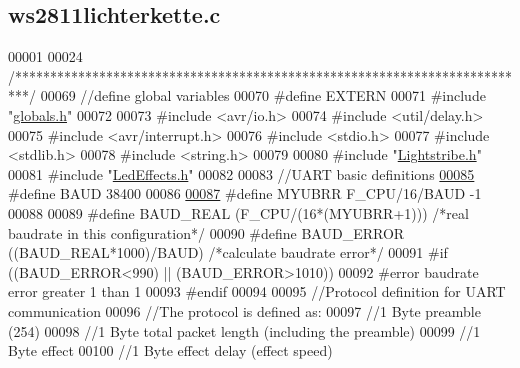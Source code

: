 \hypertarget{ws2811lichterkette_8c_source}{}\subsection{ws2811lichterkette.\+c}

\begin{DoxyCode}
00001 
00024 \textcolor{comment}{/**************************************************************************/}
00069 \textcolor{comment}{//define global variables}
00070 \textcolor{preprocessor}{#define EXTERN}
00071 \textcolor{preprocessor}{#include "\hyperlink{globals_8h}{globals.h}"}
00072 
00073 \textcolor{preprocessor}{#include <avr/io.h>}
00074 \textcolor{preprocessor}{#include <util/delay.h>}
00075 \textcolor{preprocessor}{#include <avr/interrupt.h>}
00076 \textcolor{preprocessor}{#include <stdio.h>}      
00077 \textcolor{preprocessor}{#include <stdlib.h>}    
00078 \textcolor{preprocessor}{#include <string.h>}
00079 
00080 \textcolor{preprocessor}{#include "\hyperlink{_lightstribe_8h}{Lightstribe.h}"}
00081 \textcolor{preprocessor}{#include "\hyperlink{_led_effects_8h}{LedEffects.h}"}
00082 
00083 \textcolor{comment}{//UART basic definitions}
\hypertarget{ws2811lichterkette_8c_source_l00085}{}\hyperlink{ws2811lichterkette_8c_a62634036639f88eece6fbf226b45f84b}{00085} \textcolor{comment}{}\textcolor{preprocessor}{#define BAUD 38400  }
00086 
\hypertarget{ws2811lichterkette_8c_source_l00087}{}\hyperlink{ws2811lichterkette_8c_a711e9130c825a7269c8c87dbb57a85e0}{00087} \textcolor{preprocessor}{#define MYUBRR F\_CPU/16/BAUD -1}
00088 
00089 \textcolor{preprocessor}{#define BAUD\_REAL (F\_CPU/(16*(MYUBRR+1)))       }\textcolor{comment}{/*real baudrate in this configuration*/}\textcolor{preprocessor}{}
00090 \textcolor{preprocessor}{#define BAUD\_ERROR ((BAUD\_REAL*1000)/BAUD)      }\textcolor{comment}{/*calculate baudrate error*/}\textcolor{preprocessor}{    }
00091 \textcolor{preprocessor}{#if ((BAUD\_ERROR<990) || (BAUD\_ERROR>1010))}
00092 \textcolor{preprocessor}{    #error baudrate error greater 1%
       than 1%
00093 \textcolor{preprocessor}{#endif}
00094 
00095 \textcolor{comment}{//Protocol definition for UART communication}
00096 \textcolor{comment}{//The protocol is defined as:}
00097 \textcolor{comment}{//1 Byte preamble (254)}
00098 \textcolor{comment}{//1 Byte total packet length (including the preamble)}
00099 \textcolor{comment}{//1 Byte effect}
00100 \textcolor{comment}{//1 Byte effect delay (effect speed)}
}
\end{DoxyCode}
